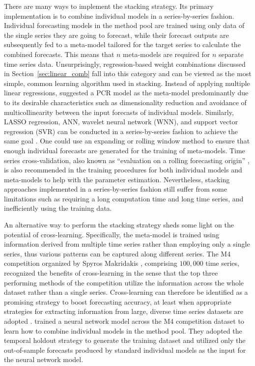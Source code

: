 \documentclass[a4paper,11pt]{article}
\begin{document}
There are many ways to implement the stacking strategy. Its primary implementation is to combine individual models in a series-by-series fashion. Individual forecasting models in the method pool are trained using only data of the single series they are going to forecast, while their forecast outputs are subsequently fed to a meta-model tailored for the target series to calculate the combined forecasts. This means that $n$ meta-models are required for $n$ separate time series data. Unsurprisingly, regression-based weight combinations discussed in Section~\ref{sec:linear_comb} \citep[e.g.,][]{Granger1984-jc,Gunter1992-go} fall into this category and can be viewed as the most simple, common learning algorithm used in stacking. Instead of applying multiple linear regressions, \citet{Moon2020-ls} suggested a PCR model as the meta-model predominantly due to its desirable characteristics such as dimensionality reduction and avoidance of multicollinearity between the input forecasts of individual models. Similarly, LASSO regression, ANN, wavelet neural network (WNN), and support vector regression (SVR) can be conducted in a series-by-series fashion to achieve the same goal \citep[e.g.,][]{Donaldson1996-um,Conflitti2015-fq,Ribeiro2019-wk,Ribeiro2020-mj}. One could use an expanding or rolling window method to ensure that enough individual forecasts are generated for the training of meta-models. Time series cross-validation, also known as ``evaluation on a rolling forecasting origin'' \citep{Hyndman2021-tx}, is also recommended in the training procedures for both individual models and meta-models to help with the parameter estimation. Nevertheless, stacking approaches implemented in a series-by-series fashion still suffer from some limitations such as requiring a long computation time and long time series, and inefficiently using the training data.

An alternative way to perform the stacking strategy sheds some light on the potential of cross-learning. Specifically, the meta-model is trained using information derived from multiple time series rather than employing only a single series, thus various patterns can be captured along different series. The M4 competition organized by Spyros Makridakis \citep{Makridakis2020-hu}, comprising $100,000$ time series, recognized the benefits of cross-learning in the sense that the top three performing methods of the competition utilize the information across the whole dataset rather than a single series. Cross-learning can therefore be identified as a promising strategy to boost forecasting accuracy, at least when appropriate strategies for extracting information from large, diverse time series datasets are adopted \citep{Kang2020-sa,Semenoglou2020-xx}. \citet{Zhao2020-ep} trained a neural network model across the M4 competition dataset to learn how to combine individual models in the method pool. They adopted the temporal holdout strategy to generate the training dataset and utilized only the out-of-sample forecasts produced by standard individual models as the input for the neural network model.
\end{document}
